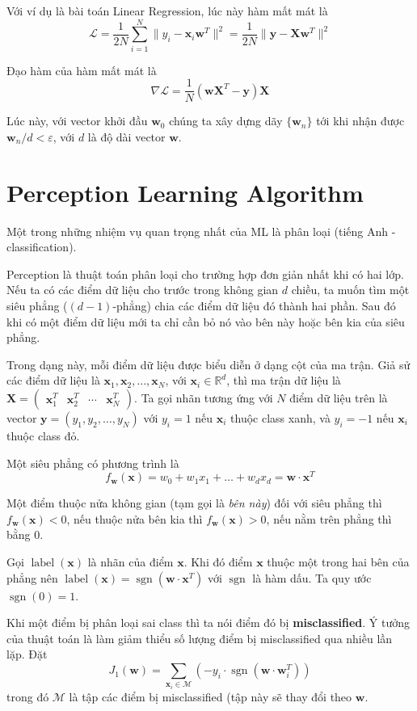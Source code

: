 \documentclass{mynotes}
\newcommand{\RR}{\mathbb{R}}
\DeclareMathOperator{\sgn}{sgn}
\DeclareMathOperator{\lb}{label}
\begin{document}
Với ví dụ là bài toán Linear Regression, lúc này hàm mất mát là \[\mathcal{L} = \dfrac{1}{2N} \sum_{i=1}^N \lVert y_i - \bm{x}_i \bm{w}^T \rVert^2 = \dfrac{1}{2N} \lVert \bm{y} - \bm{X} \bm{w}^T \rVert^2\]

Đạo hàm của hàm mất mát là \[\nabla \mathcal{L} = \dfrac{1}{N} (\bm{w} \bm{X}^T - \bm{y}) \bm{X}\]

Lúc này, với vector khởi đầu $\bm{w}_0$ chúng ta xây dựng dãy $\{ \bm{w}_n \}$ tới khi nhận được $\bm{w}_n / d < \varepsilon$, với $d$ là độ dài vector $\bm{w}$.

\section{Perception Learning Algorithm}

Một trong những nhiệm vụ quan trọng nhất của ML là phân loại (tiếng Anh - classification).

Perception là thuật toán phân loại cho trường hợp đơn giản nhất khi có hai lớp. Nếu ta có các điểm dữ liệu cho trước trong không gian $d$ chiều, ta muốn tìm một siêu phẳng ($(d-1)$-phẳng) chia các điểm dữ liệu đó thành hai phần. Sau đó khi có một điểm dữ liệu mới ta chỉ cần bỏ nó vào bên này hoặc bên kia của siêu phẳng.

Trong dạng này, mỗi điểm dữ liệu được biểu diễn ở dạng cột của ma trận. Giả sử các điểm dữ liệu là $\bm{x}_1, \bm{x}_2, \ldots, \bm{x}_N$, với $\bm{x}_i \in \RR^d$, thì ma trận dữ liệu là $\bm{X} = \begin{pmatrix}
    \bm{x}_1^T & \bm{x}_2^T & \cdots & \bm{x}_N^T
\end{pmatrix}$. Ta gọi nhãn tương ứng với $N$ điểm dữ liệu trên là vector $\bm{y} = (y_1, y_2, \ldots, y_N)$ với $y_i = 1$ nếu $\bm{x}_i$ thuộc class xanh, và $y_i = -1$ nếu $\bm{x}_i$ thuộc class đỏ.

Một siêu phẳng có phương trình là \[ f_{\bm{w}} (\bm{x}) = w_0 + w_1 x_1 + \ldots + w_d x_d = \bm{w} \cdot \bm{x}^T\]

Một điểm thuộc nửa không gian (tạm gọi là \textit{bên này}) đối với siêu phẳng thì $f_{\bm{w}} (\bm{x}) < 0$, nếu thuộc nửa bên kia thì $f_{\bm{w}} (\bm{x}) > 0$, nếu nằm trên phẳng thì bằng 0.

Gọi $\lb (\bm{x})$ là nhãn của điểm $\bm{x}$. Khi đó điểm $\bm{x}$ thuộc một trong hai bên của phẳng nên $\lb (\bm{x}) = \sgn(\bm{w} \cdot \bm{x}^T)$ với $\sgn$ là hàm dấu. Ta quy ước $\sgn(0) = 1$.

Khi một điểm bị phân loại sai class thì ta nói điểm đó bị \textbf{misclassified}. Ý tưởng của thuật toán là làm giảm thiểu số lượng điểm bị misclassified qua nhiều lần lặp. Đặt \[ J_1 (\bm{w}) = \sum_{\bm{x}_i \in \mathcal{M}} (-y_i \cdot \sgn (\bm{w} \cdot \bm{w}_i^T)) \] trong đó $\mathcal{M}$ là tập các điểm bị misclassified (tập này sẽ thay đổi theo $\bm{w}$.
\end{document}
